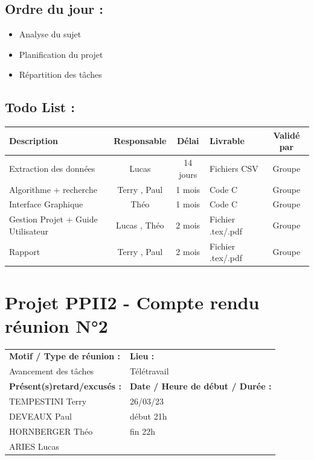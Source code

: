 \documentclass[12pt,titlepage]{report}
\begin{document}
\subsection*{Ordre du jour :}
\begin{itemize}
    \item{Analyse du sujet}
    \item{Planification du projet}
    \item{Répartition des tâches}
\end{itemize}

\subsection*{Todo List :}
\begin{tabular}{|p{3.5cm}|c|c|p{4.5cm}|c|}
    \hline 
    Description & Responsable & Délai & Livrable & Validé par 
    \\ \hline
    Extraction des données & Lucas  & 14 jours & Fichiers CSV & Groupe\\
    Algorithme + recherche & Terry , Paul  & 1 mois & Code C & Groupe\\
    Interface Graphique & Théo  & 1 mois & Code C & Groupe\\
    Gestion Projet + Guide Utilisateur & Lucas , Théo  & 2 mois & Fichier .tex/.pdf & Groupe\\
    Rapport & Terry , Paul  & 2 mois & Fichier .tex/.pdf & Groupe
    \\ \hline
\end{tabular}
\newpage

\section*{Projet PPII2 - Compte rendu réunion N°2}
\begin{tabular}{|p{7cm}|p{6cm}|}
    \hline
    \textbf{Motif / Type de réunion :}
    & \textbf{Lieu :}
    \\
    Avancement des tâches
    & 
    Télétravail
    \\ \hline
    \textbf{Présent(s)retard/excusés :}
    &
    \textbf{Date / Heure de début / Durée :}
    \\ 
    TEMPESTINI Terry &  26/03/23\\  
    DEVEAUX Paul & début 21h\\
    HORNBERGER Théo & fin 22h\\
    ARIES Lucas & 
    \\ \hline
\end{tabular}
\end{document}
